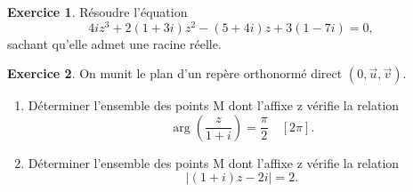 \documentclass[a4paper, 11pt,openany]{article}%
\theoremstyle{plain}
\theoremstyle{definition}
\newtheorem{exo}{Exercice}
\newtheorem{sol}{Solution de l'exercice}
\theoremstyle{remark}
\begin{document}
\begin{exo}
Résoudre l'équation 
\[ 4iz^3+2(1+3i)z^2-(5+4i)z+3(1-7i)=0,\]
sachant qu'elle admet une racine réelle.
\end{exo}


\begin{exo}
On munit le plan d'un repère orthonormé direct $(0,\overrightarrow{u},\overrightarrow{v})$.
\begin{enumerate}
\item Déterminer l'ensemble des points M dont l'affixe z vérifie la relation
\[ \arg \left( \frac{z}{1+i} \right) = \frac{\pi}{2} \quad [2\pi].\]
\item Déterminer l'ensemble des points M dont l'affixe z vérifie la relation
\[ |(1+i)z - 2i| = 2.\]
\end{enumerate}
\end{exo}

\end{document}
